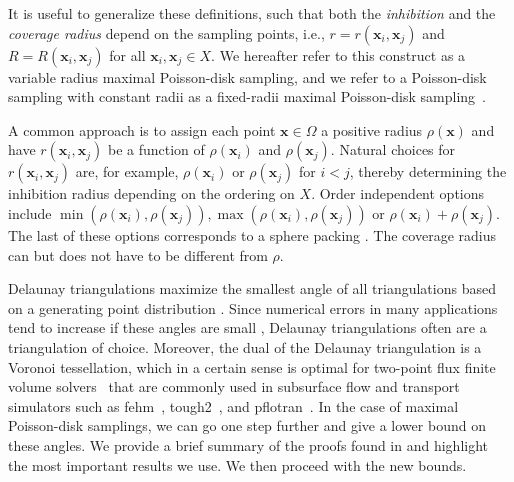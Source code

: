 \documentclass[preprint, 10pt]{elsarticle}
\newcommand{\vx}{{\mathbf x}}
\theoremstyle{definition}
\theoremstyle{remark}
\begin{document}
It is useful to generalize these definitions, such that both the \textit{inhibition} and the \textit{coverage radius} depend on the sampling points, i.e., $r=r(\vx_i,\vx_j)$ and $R=R(\vx_i,\vx_j)$ for all $\vx_i,\vx_j\in X$. 
We hereafter refer to this construct as a variable radius maximal Poisson-disk sampling, and we refer to a Poisson-disk sampling with constant radii as a fixed-radii maximal Poisson-disk sampling~\cite{varrad}.

A common approach is to assign each point $\vx\in \Omega$ a positive radius $\rho(\vx)$ and have $r(\vx_i,\vx_j)$ be a function of $\rho(\vx_i)$ and $\rho(\vx_j)$. 
Natural choices for $r(\vx_i,\vx_j)$ are, for example, $\rho(\vx_i)$ or $\rho(\vx_j)$ for $i<j$, thereby determining the inhibition radius depending on the ordering on $X$. Order independent options include $\min(\rho(\vx_i),\rho(\vx_j)), \max(\rho(\vx_i),\rho(\vx_j))$ or $\rho(\vx_i)+\rho(\vx_j)$. 
The last of these options corresponds to a sphere packing \cite{varrad}. 
The coverage radius can but does not have to be different from $\rho$.



Delaunay triangulations maximize the smallest angle of all triangulations based on a generating point distribution \cite{def_delaunay}. 
Since numerical errors in many applications tend to increase if these angles are small \cite{ZLAMAL}, Delaunay triangulations often are a triangulation of choice.
Moreover, the dual of the Delaunay triangulation is a Voronoi tessellation, which in a certain sense is optimal for two-point flux finite volume solvers~\cite{eymard2000finite} that are commonly used in subsurface flow and transport simulators such as {\sc fehm}~\cite{zyvoloski2007fehm}, {\sc tough2}~\cite{pruess1999tough2}, and {\sc pflotran}~\cite{lichtner2015pflotran}. 
In the case of maximal Poisson-disk samplings, we can go one step further and give a lower bound on these angles. 
We provide a brief summary of the proofs found in \cite{varrad} and highlight the most important results we use. 
We then proceed with the new bounds.
\end{document}

